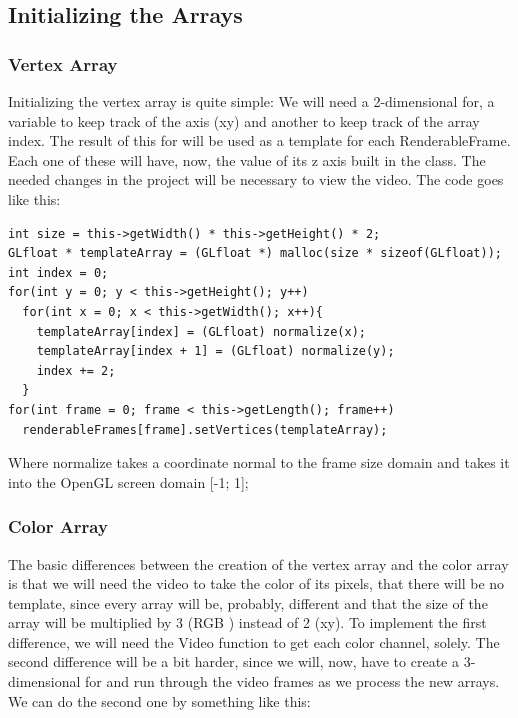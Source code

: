 \documentclass[11pt]{article}
\begin{document}
\subsection*{Initializing the Arrays}
\label{sec:org54cb0a7}

\subsubsection*{Vertex Array}
\label{sec:orgf2c2ef8}

Initializing the vertex array is quite simple: We will need a 2-dimensional for, a variable to keep track of the axis (xy) and another to keep track of the array index. The result of this for will be used as a template for each RenderableFrame. Each one of these will have, now, the value of its z axis built in the class. The needed changes in the project will be necessary to view the video. The code goes like this:

\begin{verbatim}
int size = this->getWidth() * this->getHeight() * 2;
GLfloat * templateArray = (GLfloat *) malloc(size * sizeof(GLfloat));
int index = 0;
for(int y = 0; y < this->getHeight(); y++)
  for(int x = 0; x < this->getWidth(); x++){
    templateArray[index] = (GLfloat) normalize(x);
    templateArray[index + 1] = (GLfloat) normalize(y);
    index += 2;
  }
for(int frame = 0; frame < this->getLength(); frame++)
  renderableFrames[frame].setVertices(templateArray);
\end{verbatim}

Where normalize takes a coordinate normal to the frame size domain and takes it into the OpenGL screen domain [-1; 1];

\subsubsection*{Color Array}
\label{sec:org84c11be}

The basic differences between the creation of the vertex array and the color array is that we will need the video to take the color of its pixels, that there will be no template, since every array will be, probably, different and that the size of the array will be multiplied by 3 (RGB ) instead of 2 (xy). To implement the first difference, we will need the Video function to get each color channel, solely. The second difference will be a bit harder, since we will, now, have to create a 3-dimensional for and run through the video frames as we process the new arrays. We can do the second one by something like this:
\end{document}
